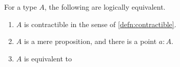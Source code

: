 \documentclass[hott-all.tex]{subfiles}
\begin{document}
%

\begin{lem}\label{thm:contr-unit}
  For a type $A$, the following are logically equivalent.
  \begin{enumerate}
  \item $A$ is contractible in the sense of \cref{defn:contractible}.\label{item:contr}
  \item $A$ is a mere proposition, and there is a point $a:A$.\label{item:contr-inhabited-prop}
  \item $A$ is equivalent to \unit.\label{item:contr-eqv-unit}
  \end{enumerate}
\end{lem}
%
\end{document}
